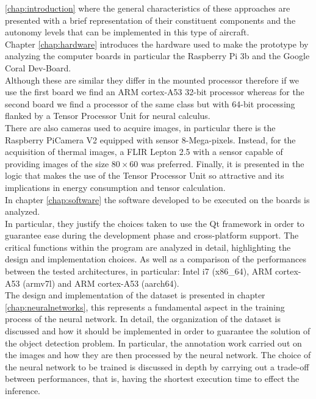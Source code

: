 \ref{chap:introduction} where the general characteristics of these approaches
are presented with a brief representation of their constituent components and
the autonomy levels that can be implemented in this type of aircraft.\\
\noindent Chapter \ref{chap:hardware} introduces the hardware used to make the
prototype by analyzing the computer boards in particular the Raspberry Pi 3b and
the Google Coral Dev-Board.\\
Although these are similar they differ in the mounted processor therefore if we
use the first board we find an ARM cortex-A53 32-bit processor whereas for the
second board we find a processor of the same class but with 64-bit processing
flanked by a Tensor Processor Unit for neural calculus.\\
There are also cameras used to acquire images, in particular there is the
Raspberry PiCamera V2 equipped with sensor 8-Mega-pixels. 
Instead, for the acquisition of thermal images, a FLIR Lepton 2.5 with a sensor
capable of providing images of the size $ 80 \times 60 $ was preferred.
Finally, it is presented in the logic that makes the use of the Tensor Processor
Unit so attractive and its implications in energy consumption and tensor
calculation.\\
\noindent In chapter \ref{chap:software} the software developed to be executed
on the boards is analyzed.\\ 
In particular, they justify the choices taken to use the Qt framework in
order to guarantee ease during the development phase and cross-platform support.
The critical functions within the program are analyzed in detail, highlighting
the design and implementation choices.
As well as a comparison of the performances between the tested architectures, in
particular: Intel i7 (x86\_64), ARM cortex-A53 (armv7l) and ARM cortex-A53
(aarch64).\\
\noindent The design and implementation of the dataset is presented in chapter
\ref{chap:neuralnetworks}, this represents a fundamental aspect in the training
process of the neural network.
In detail, the organization of the dataset is discussed and how it should be
implemented in order to guarantee the solution of the object detection problem.
In particular, the annotation work carried out on the images and how they are
then processed by the neural network.
The choice of the neural network to be trained is discussed in depth by carrying
out a trade-off between performances, that is, having the shortest execution
time to effect the inference. 
